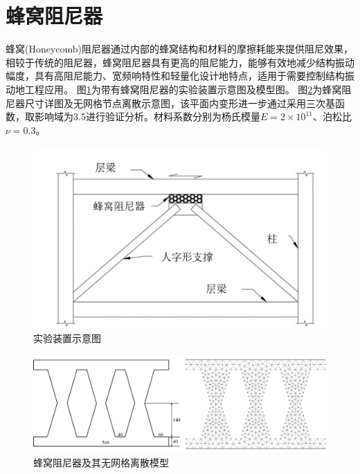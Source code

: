 \section{蜂窝阻尼器}
蜂窝(Honeycomb)阻尼器通过内部的蜂窝结构和材料的摩擦耗能来提供阻尼效果，相较于传统的阻尼器，蜂窝阻尼器具有更高的阻尼能力，能够有效地减少结构振动幅度，具有高阻尼能力、宽频响特性和轻量化设计地特点，适用于需要控制结构振动地工程应用。
图\ref{Honeycomb1}为带有蜂窝阻尼器的实验装置示意图及模型图。
图\ref{Honeycombmsh}为蜂窝阻尼器尺寸详图及无网格节点离散示意图，该平面内变形进一步通过采用三次基函数，取影响域为3.5进行验证分析。材料系数分别为杨氏模量$E=2\times 10^{11}$、泊松比$\nu=0.3$。
\begin{figure}[H]
    \centering
    \includegraphics[scale=0.6]{figure/DAMPER/Honeycomb/1.png}
    \caption{实验装置示意图\cite{javanmardi2020}}\label{Honeycomb1}
\end{figure}
\begin{figure}[H]
    \centering
    \includegraphics[scale=0.45]{figure/DAMPER/Honeycomb/honeycomb_damper_msh.png}
    \caption{蜂窝阻尼器及其无网格离散模型}\label{Honeycombmsh}
\end{figure}
